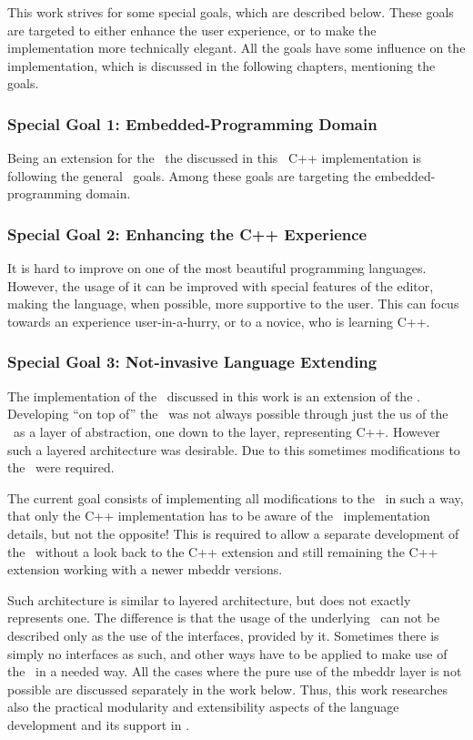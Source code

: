This work strives for some special goals, which are described below. These goals are targeted to either enhance
the user experience, or to make the implementation more technically elegant. All the goals have some influence on the implementation,
which is discussed in the following chapters, mentioning the goals.

\subsubsection{Special Goal 1: Embedded-Programming Domain}
\label{g1}

Being an extension for the \mbp\ the discussed in this \MT\ C++ implementation is following the general \mb\ goals. Among these goals are targeting
the embedded-programming domain.

\subsubsection{Special Goal 2: Enhancing the C++ Experience}
\label{g2}

It is hard to improve on one of the most beautiful programming languages. However, the usage of it can be improved
with special features of the editor, making the language, when possible, more supportive to the user. This can focus
towards an experience user-in-a-hurry, or to a novice, who is learning C++.

\subsubsection{Special Goal 3: Not-invasive Language Extending}
\label{g3}

The implementation of the \cpppl\ discussed in this work is an extension of the \mbp. 
Developing ``on top of'' the \mbp\ was not always possible through just the us of the \mbp\ 
as a layer of abstraction, one down to the layer, representing C++. However such a layered architecture
was desirable. Due to this sometimes modifications to the \mbp\ were required. 

The current goal consists of implementing all modifications to the \mbp\ in such a way, that only 
the C++ implementation has to be aware of the \mbp\ implementation details, but not the opposite! 
This is required to allow a separate development of the  \mbp\ without a look back to the C++ extension 
and still remaining the C++ extension working with a newer mbeddr versions. 

Such architecture is similar to layered architecture, but does not exactly represents one. The difference
is that the usage of the underlying \mbp\ can not be described only as the use of the interfaces, provided
by it. Sometimes there is simply no interfaces as such, and other ways have to be applied to make use of the
\mbp\ in a needed way. All the cases where the pure use of the mbeddr layer is not possible are discussed
separately in the work below. Thus, this work researches also the practical modularity and extensibility aspects of 
the language development and its support in \jbmps.